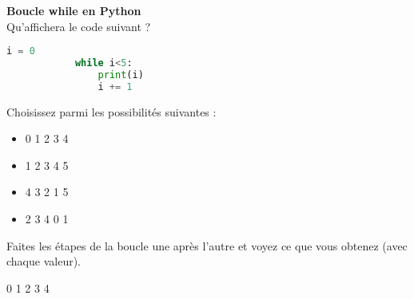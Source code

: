     
    \begin{Exercice}[5 minutes] \textbf{Boucle while en Python}\\
      	Qu'affichera le code suivant ?
      	
      	\begin{lstlisting}[language=Python]
                i = 0
    		while i<5:
        		print(i)
        		i += 1
        		 \end{lstlisting}
             	
        Choisissez parmi les possibilités suivantes :
        
        \begin{itemize}
        
        \item 0 
        1 
        2 
        3 
        4 
        \item 1  
        2 
        3 
        4 
        5 
        \item 4 
        3 
        2 
        1 
        5 
        \item 2 
        3 
        4 
        0 
        1
        \end{itemize}
    
        \begin{conseil}
		   Faites les étapes de la boucle une après l'autre et voyez ce que vous obtenez (avec chaque valeur).  
        \end{conseil}
        
        \begin{solution}
            0 
            1 
            2 
            3 
            4
        \end{solution}
    \end{Exercice}
    

